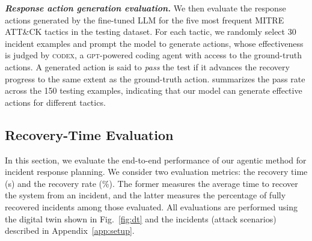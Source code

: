 \documentclass[runningheads,10pt]{llncs}
\begin{document}
\noindent\textit{\textbf{Response action generation evaluation.}}
We then evaluate the response actions generated by the fine-tuned LLM for the five most frequent MITRE ATT\&CK tactics in the testing dataset. For each tactic, we randomly select 30 incident examples and prompt the model to generate actions, whose effectiveness is judged by \textsc{codex}, a \textsc{gpt}-powered coding agent with access to the ground-truth actions. A generated action is said to \textit{pass} the test if it advances the recovery progress to the same extent as the ground-truth action.  summarizes the pass rate across the 150 testing examples, indicating that our model can generate effective actions for different tactics.
\begin{table}[h]
    \centering
    \caption{Evaluation of the LLM for action generation.}
    \label{tab:action-recovery-effect}
    \vspace{-4em}
\end{table}

\subsection{Recovery-Time Evaluation}
In this section, we evaluate the end-to-end performance of our agentic method for incident response planning. We consider two evaluation metrics: the recovery time (s) and the recovery rate (\%). The former measures the average time to recover the system from an incident, and the latter measures the percentage of fully recovered incidents among those evaluated. All evaluations are performed using the digital twin shown in Fig.~\ref{fig:dt} and the incidents (attack scenarios) described in Appendix~\ref{app:setup}.
\end{document}
